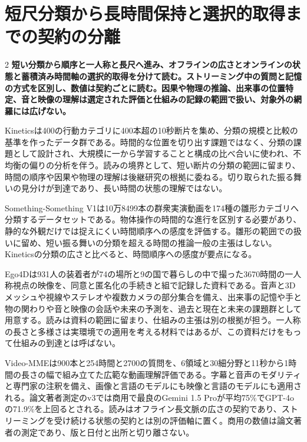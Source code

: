 \documentclass[lualatex,a4paper,10pt]{jlreq}
\begin{document}
\Needspace{0.20\textheight}
\section{短尺分類から長時間保持と選択的取得までの契約の分離}
\label{sec:p11}
\begin{multicols}{2}
\raggedcolumns
\noindent\textbf{短い分類から順序と一人称と長尺へ進み、オフラインの広さとオンラインの状態と蓄積済み時間軸の選択的取得を分けて読む。ストリーミング中の質問と記憶の方式を区別し、数値は契約ごとに読む。因果や物理の推論、出来事の位置特定、音と映像の理解は選定された評価と仕組みの記録の範囲で扱い、対象外の網羅には広げない。}\autocite{vmd086,vmd088,vmd089}\par\medskip
\noindent Kineticsは400の行動カテゴリに400本超の10秒断片を集め、分類の規模と比較の基準を作ったデータ群である。時間的な位置を切り出す課題ではなく、分類の課題として設計され、大規模に一から学習することと構成の比べ合いに使われ、不均衡の偏りの分析を伴う。読みの境界として、短い断片の分類の範囲に留まり、時間の順序や因果や物理の理解は後継研究の根拠に委ねる。切り取られた振る舞いの見分けが到達であり、長い時間の状態の理解ではない。\autocite{vmd083}\par\medskip
\noindent Something-Something V1は10万8499本の群衆実演動画を174種の雛形カテゴリへ分類するデータセットである。物体操作の時間的な進行を区別する必要があり、静的な外観だけでは捉えにくい時間順序への感度を評価する。雛形の範囲での扱いに留め、短い振る舞いの分類を超える時間の推論一般の主張はしない。Kineticsの分類の広さと比べると、時間順序への感度が要点になる。\autocite{vmd084}\par\medskip
\noindent Ego4Dは931人の装着者が74の場所と9の国で暮らしの中で撮った3670時間の一人称視点の映像を、同意と匿名化の手続きと組で記録した資料である。音声と3Dメッシュや視線やステレオや複数カメラの部分集合を備え、出来事の記憶や手と物の関わりや音と映像の会話や未来の予測を、過去と現在と未来の課題群として用意する。読みは資料の範囲に留まり、仕組みの主張は別の根拠が担う。一人称の長さと多様さは実環境での適用を考える材料ではあるが、この資料だけをもって仕組みの到達とは呼ばない。\autocite{vmd085}\par\medskip
\noindent Video-MMEは900本と254時間と2700の質問を、6領域と30細分野と11秒から1時間の長さの幅で組み立てた広範な動画理解評価である。字幕と音声のモダリティと専門家の注釈を備え、画像と言語のモデルにも映像と言語のモデルにも適用される。論文著者測定のv3では商用で最良のGemini 1.5 Proが平均75\%でGPT-4oの71.9\%を上回るとされる。読みはオフライン長文脈の広さの契約であり、ストリーミングを受け続ける状態の契約とは別の評価軸に置く。商用の数値は論文著者の測定であり、版と日付と出所と切り離さない。\autocite{vmd086}\par\medskip

\end{multicols}
\end{document}
